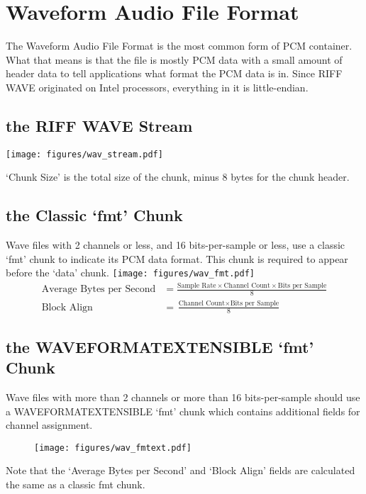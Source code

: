 
\chapter{Waveform Audio File Format}
The Waveform Audio File Format is the most common form of PCM container.
What that means is that the file is mostly PCM data with a
small amount of header data to tell applications what format the
PCM data is in.
Since RIFF WAVE originated on Intel processors, everything in it
is little-endian.
\section{the RIFF WAVE Stream}
\texttt{[image: figures/wav\_stream.pdf]}
\par
\noindent
`Chunk Size' is the total size of the chunk, minus
8 bytes for the chunk header.
\section{the Classic `fmt' Chunk}
Wave files with 2 channels or less, and 16 bits-per-sample or less,
use a classic `fmt' chunk to indicate its PCM data format.
This chunk is required to appear before the `data' chunk.
\texttt{[image: figures/wav\_fmt.pdf]}
\begin{align}
\text{Average Bytes per Second} &= \frac{\text{Sample Rate}
  \times \text{Channel Count} \times \text{Bits per Sample}}{8} \\
\text{Block Align} &= \frac{\text{Channel Count} \times \text{Bits per Sample}}{8}
\end{align}
\section{the WAVEFORMATEXTENSIBLE `fmt' Chunk}
Wave files with more than 2 channels or more than 16 bits-per-sample
should use a WAVEFORMATEXTENSIBLE `fmt' chunk which contains
additional fields for channel assignment.
\begin{figure}[h]
\texttt{[image: figures/wav\_fmtext.pdf]}
\end{figure}
\par
\noindent
Note that the `Average Bytes per Second' and `Block Align' fields
are calculated the same as a classic fmt chunk.

